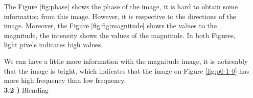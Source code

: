 \documentclass[12pt,a4paper]{article}
\begin{document}
The Figure \ref{fig:phase} shows the phase of the image, it is hard to obtain some information from this image. However, it is respective to the directions of the image. Moreover, the Figure \ref{fig:fig:magnitude} shows the values to the magnitude, the intensity shows the values of the magnitude. In both Figures, light pixels indicates high values.

We can have a little more information with the magnitude image, it is noticeably that the image is bright, which indicates that the image on Figure \ref{fig:p0-1-0} has more high frequency than low frequency. \\



\textbf{3.2 )} Blending \\
\end{document}
